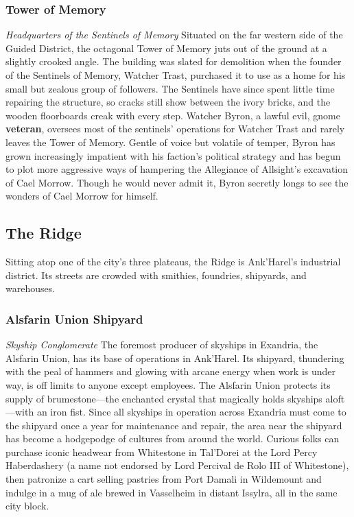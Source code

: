 \documentclass[10pt,a4,twoside,twocolumn,openany,nodeprecatedcode]{dndbook}
\begin{document}
\subsubsection{Tower of Memory}
\textit{Headquarters of the Sentinels of Memory}
Situated on the far western side of the Guided District, the octagonal Tower of Memory juts out of the ground at a slightly crooked angle. The building was slated for demolition when the founder of the Sentinels of Memory, Watcher Trast, purchased it to use as a home for his small but zealous group of followers. The Sentinels have since spent little time repairing the structure, so cracks still show between the ivory bricks, and the wooden floorboards creak with every step.
Watcher Byron, a lawful evil, gnome \textbf{veteran}, oversees most of the sentinels' operations for Watcher Trast and rarely leaves the Tower of Memory. Gentle of voice but volatile of temper, Byron has grown increasingly impatient with his faction's political strategy and has begun to plot more aggressive ways of hampering the Allegiance of Allsight's excavation of Cael Morrow. Though he would never admit it, Byron secretly longs to see the wonders of Cael Morrow for himself.
\subsection{The Ridge}
Sitting atop one of the city's three plateaus, the Ridge is Ank'Harel's industrial district. Its streets are crowded with smithies, foundries, shipyards, and warehouses.
\subsubsection{Alsfarin Union Shipyard}
\textit{Skyship Conglomerate}
The foremost producer of skyships in Exandria, the Alsfarin Union, has its base of operations in Ank'Harel. Its shipyard, thundering with the peal of hammers and glowing with arcane energy when work is under way, is off limits to anyone except employees. The Alsfarin Union protects its supply of brumestone—the enchanted crystal that magically holds skyships aloft—with an iron fist.
Since all skyships in operation across Exandria must come to the shipyard once a year for maintenance and repair, the area near the shipyard has become a hodgepodge of cultures from around the world. Curious folks can purchase iconic headwear from Whitestone in Tal'Dorei at the Lord Percy Haberdashery (a name not endorsed by Lord Percival de Rolo III of Whitestone), then patronize a cart selling pastries from Port Damali in Wildemount and indulge in a mug of ale brewed in Vasselheim in distant Issylra, all in the same city block.
\end{document}

